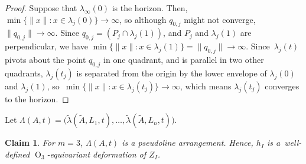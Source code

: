 \documentclass[JEP,XML,SOM,Unicode,NoFloatCountersInSection,published]{cedram}
\newtheorem{claim}[theorem]{Claim}
\theoremstyle{remark}
\DeclareMathOperator{\orth}{O}
\begin{document}
\begin{proof}
Suppose that $\lambda_\infty(0)$ is the horizon.
Then, $\min \{\|x\| : x \in \lambda_j(0)\} \to \infty$, so
although $q_{0,j}$ might not converge, $\|q_{0,j}\| \to \infty$.
Since $q_{0,j} = (P_{j} \cap \lambda_j(1))$, and $P_{j}$ and $\lambda_j(1)$ are perpendicular, we have $\min \{\|x\| : x \in \lambda_j(1)\} = \|q_{0,j}\| \to \infty$.
Since~$\lambda_j(t)$ pivots about the point $q_{0,j}$ in one quadrant, and is parallel in two other quadrants, $\lambda_j(t_j)$ is separated from the origin by the lower envelope of $\lambda_j(0)$ and $\lambda_j(1)$, so~\hbox{$\min \{\|x\| : x \in \lambda_j(t_j)\} \to \infty$}, which means $\lambda_j(t_j)$ converges to the horizon.
\end{proof}

Let $\Lambda(A,t) = \bigl(\tilde \lambda(\tilde A,L_1,t),\dots,\tilde \lambda(\tilde A,L_n,t)\bigr)$.

\begin{claim}\label{claim-lambda-arrangement-3}
For $m=3$, $\Lambda(A,t)$ is a pseudoline arrangement. Hence, $h_I$ is a~well-defined $\orth_3$-equivariant deformation of $Z_I$.
\end{claim}
\end{document}
